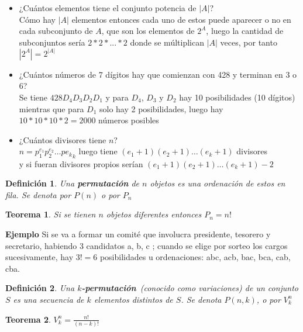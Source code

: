 \documentclass[a4paper,12pt]{report}
\newtheorem*{teo}{Teorema}
\newtheorem*{dfn}{Definición}
\begin{document}
\begin{itemize}
 \item ¿Cuántos elementos tiene el conjunto potencia de $|A|$? \\
 Cómo hay $|A|$ elementos entonces cada uno de estos puede aparecer o no en cada subconjunto de $A$, que son los elementos de $2^A$, luego la cantidad de subconjuntos sería $2*2*...*2$ donde se múltiplican $|A|$ veces, por tanto $|2^A|=2^{|A|}$
 
 \item ¿Cuántos números de 7 dígitos hay que comienzan con 428 y terminan en 3 o 6?\\
  Se tiene $428D_4D_3D_2D_1$ y para $D_4$, $D_3$ y $D_2$ hay 10 posibilidades (10 dígitos) mientras que para $D_1$ solo hay 2 posibilidades, luego hay\\ 
 $10*10*10*2=2000$ números posibles
 
 \item ¿Cuántos divisores tiene $n$?\\
 $n=p^{e_1}_1 p^{e_2}_2 \dots p{e_k}_k$ luego tiene $(e_1+1)(e_2+1)\dots(e_k+1)$ divisores\\
 y si fueran divisores propios serían $(e_1+1)(e_2+1)\dots(e_k+1)-2$ 
 
\end{itemize}



\begin{dfn}
 Una \textbf{permutación} de $n$ objetos es una ordenación de estos en fila. Se denota por $P(n)$ o por $P_n$  
\end{dfn}

\begin{teo}
 Si se tienen $n$ objetos diferentes entonces $P_n = n!$
\end{teo}

\textbf{Ejemplo}
 Si se va a formar un comité que involucra presidente, tesorero y secretario, habiendo 3 candidatos a, b, c ; cuando se elige por sorteo los cargos sucesivamente, hay $3!=6$ posibilidades u ordenaciones: abc, acb, bac, bca, cab, cba.

\begin{dfn}
 Una \textbf{$k$-permutación}~(conocido como variaciones) de un conjunto $S$ es una secuencia de $k$ elementos distintos de $S$. Se denota $P(n,k)$, o por $V^n_k$ 
\end{dfn}

\begin{teo}
 $V^n_k=\frac{n!}{(n-k)!}$
\end{teo}
\end{document}

